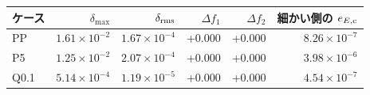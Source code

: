 \begin{tabular}{lrrrrr}\toprule
ケース & $\delta_{\max}$ & $\delta_{\rm rms}$ & $\Delta f_1$ & $\Delta f_2$ & 細かい側の $e_{E,\rm c}$ \\
\midrule
PP & $1.61\times 10^{-2}$ & $1.67\times 10^{-4}$ & +0.000 & +0.000 & $8.26\times 10^{-7}$ \\
P5 & $1.25\times 10^{-2}$ & $2.07\times 10^{-4}$ & +0.000 & +0.000 & $3.98\times 10^{-6}$ \\
Q0.1 & $5.14\times 10^{-4}$ & $1.19\times 10^{-5}$ & +0.000 & +0.000 & $4.54\times 10^{-7}$ \\
\bottomrule\end{tabular}

